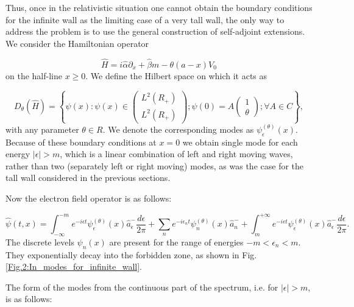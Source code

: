 \documentclass[12pt]{article}
\begin{document}
Thus, once in the relativistic situation one cannot obtain the boundary conditions for the infinite wall
as the limiting case of a very tall wall, the only way to address the problem is to use the general construction of self-adjoint extensions. We consider the Hamiltonian operator

\begin{equation}
    \hat{H}=i\hat{\alpha}\partial_{x}+\hat{\beta}m-\theta(a-x)V_0
\end{equation}
on the half-line $x\geq 0$. We define the Hilbert space on which it acts as 

\begin{equation}
D_{\theta}(\hat{H})=\left\{\psi(x): \psi(x)\in\begin{pmatrix} L^2(R_{+})\\
		L^2(R_{+}) \end{pmatrix}; \psi(0)=A\begin{pmatrix} 1\\
		\theta \end{pmatrix};\forall A\in C\right\},
\end{equation}
with any parameter $\theta\in R$. We denote the corresponding modes as $\psi^{(\theta)}_{\epsilon}(x)$. Because of these boundary conditions at $x=0$ we obtain single mode for each energy $|\epsilon|>m$, which is a linear combination of left and right moving waves, rather than two (separately left or right moving) modes, as was the case for the tall wall considered in the previous sections. 
	
Now the electron field operator is as follows:

\begin{equation}
    \hat{\psi}(t,x)=\int^{-m}_{-\infty}e^{-i\epsilon t}\psi_{\epsilon}^{(\theta)}(x)\hat{a}^{-}_{\epsilon}\frac{d\epsilon}{2\pi}+\sum_{n}e^{-i\epsilon_n t}\psi_{n}^{(\theta)}(x)\hat{a}^{-}_{n}+\int^{+\infty}_{m}e^{-i\epsilon t}\psi^{(\theta)}_{\epsilon}(x)\hat{a}^{-}_{\epsilon}\frac{d\epsilon}{2\pi}.
\end{equation}
The discrete levels $\psi_{n}(x)$ are present for the range of energies $-m<\epsilon_n<m$. They exponentially decay into the forbidden zone, as shown in Fig. \ref{Fig.2:In_modes_for_infinite_wall}.

The form of the modes from the continuous part of the spectrum, i.e. for $|\epsilon|>m$, is as follows:
\end{document}
